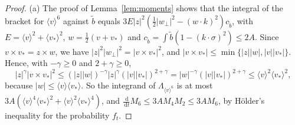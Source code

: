 \documentclass[11pt]{amsart}
\theoremstyle{definition}
\newcommand{\dd}{\,\mathrm{d}}
\newcommand{\jb}[1]{\langle #1\rangle}
\begin{document}
\begin{proof}
(a) The proof of Lemma~\ref{lem:moments} shows that the integral of the bracket for $\jb{v}^6$ against $\tilde b$ equals $3E|z|^2(\frac12|w_\perp|^2-(w\cdot k)^2)c_{\tilde b}$, with $E=\jb{v}^2+\jb{v_*}^2$, $w=\frac12(v+v_*)$ and $c_{\tilde b}=\int\tilde b(1-(k\cdot\sigma)^2)\le2A$. Since $v\times v_*=z\times w$, we have $|z|^2|w_\perp|^2=|v\times v_*|^2$, and $|v\times v_*|\le\min\{|z||w|,|v||v_*|\}$. Hence, with $-\gamma\ge0$ and $2+\gamma\ge0$,
\[
|z|^\gamma|v\times v_*|^2\le(|z||w|)^{-\gamma}|z|^\gamma(|v||v_*|)^{2+\gamma}=|w|^{-\gamma}(|v||v_*|)^{2+\gamma}\le\jb{v}^2\jb{v_*}^2,
\]
because $|w|\le\jb{v}\jb{v_*}$. So the integrand of $\Lambda_{\jb{v}^6}$ is at most $3A(\jb{v}^4\jb{v_*}^2+\jb{v}^2\jb{v_*}^4)$, and $\frac{\dd}{\dd t}M_6\le3AM_4M_2\le3AM_6$, by Hölder's inequality for the probability $f_t$.


\end{proof}
\end{document}
